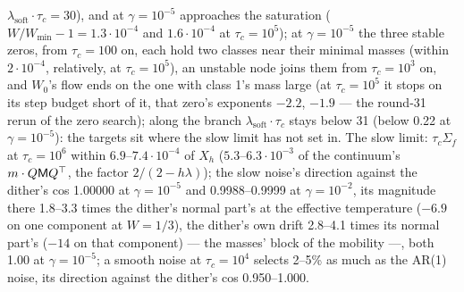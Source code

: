 \begin{sloppypar}
$\lambda_{\mathrm{soft}}\cdot\tau_c = 30$), and at $\gamma = 10^{-5}$ approaches the saturation
($W/W_{\min} - 1 = 1.3\cdot10^{-4}$ and $1.6\cdot10^{-4}$ at $\tau_c = 10^5$); at $\gamma = 10^{-5}$ the three stable
zeros, from $\tau_c = 100$ on, each hold two classes near their minimal masses (within $2\cdot10^{-4}$, relatively, at
$\tau_c = 10^5$), an unstable node joins them from $\tau_c = 10^3$ on, and $W_0$'s flow ends on the one with class 1's
mass large (at $\tau_c = 10^5$ it stops on its step budget short of it, that zero's exponents $-2.2$, $-1.9$ --- the
round-31 rerun of the zero search); along the branch $\lambda_{\mathrm{soft}}\cdot\tau_c$ stays below 31 (below 0.22 at
$\gamma = 10^{-5}$): the targets sit where the slow limit has not set in. The slow limit: $\tau_c\Sigma_f$ at $\tau_c = 10^6$ within
$6.9$--$7.4\cdot10^{-4}$ of $X_h$ ($5.3$--$6.3\cdot10^{-3}$ of the continuum's $m\cdot Q\mathsf MQ^\top$, the factor
$2/(2 - h\lambda)$); the slow noise's direction against the dither's cos 1.00000 at $\gamma = 10^{-5}$ and
0.9988--0.9999 at $\gamma = 10^{-2}$, its magnitude there 1.8--3.3 times the dither's normal part's at the effective
temperature ($-6.9$ on one component at $W = 1/3$), the dither's own drift 2.8--4.1 times its normal part's ($-14$ on
that component) --- the masses' block of the mobility ---, both 1.00 at $\gamma = 10^{-5}$; a smooth noise at
$\tau_c = 10^4$ selects 2--5\% as much as the AR(1) noise, its direction against the dither's cos 0.950--1.000.
\end{sloppypar}

